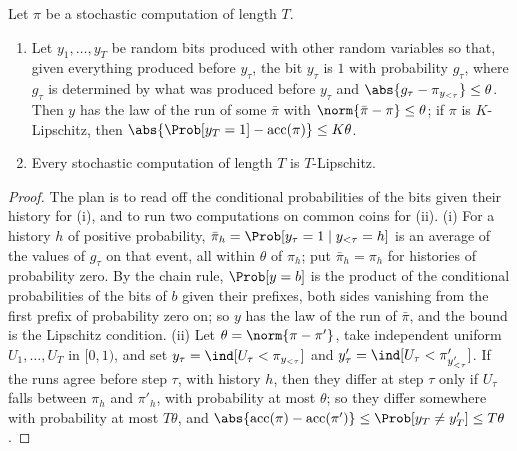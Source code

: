 \begin{refsection}
\begin{lemma}\label{lem:efficientdebate:perturb}
Let $\pi$ be a stochastic computation of length $T$.
\begin{enumerate}
\item Let $y_1,\dots,y_T$ be random bits produced with other random variables so that, given everything produced before $y_\tau$, the bit $y_\tau$ is $1$ with probability $g_\tau$, where $g_\tau$ is determined by what was produced before $y_\tau$ and $\abs{g_\tau-\pi_{y_{<\tau}}}\le\theta$. Then $y$ has the law of the run of some $\bar\pi$ with $\norm{\bar\pi-\pi}\le\theta$; if $\pi$ is $K$-Lipschitz, then $\abs{\Prob[y_T=1]-\efficientdebateacc(\pi)}\le K\theta$.
\item Every stochastic computation of length $T$ is $T$-Lipschitz.
\end{enumerate}
\end{lemma}

\begin{proof}
The plan is to read off the conditional probabilities of the bits given their history for (i), and to run two computations on common coins for (ii). (i) For a history $h$ of positive probability, $\bar\pi_h=\Prob[y_\tau=1\mid y_{<\tau}=h]$ is an average of the values of $g_\tau$ on that event, all within $\theta$ of $\pi_h$; put $\bar\pi_h=\pi_h$ for histories of probability zero. By the chain rule, $\Prob[y=b]$ is the product of the conditional probabilities of the bits of $b$ given their prefixes, both sides vanishing from the first prefix of probability zero on; so $y$ has the law of the run of $\bar\pi$, and the bound is the Lipschitz condition. (ii) Let $\theta=\norm{\pi-\pi'}$, take independent uniform $U_1,\dots,U_T$ in $[0,1)$, and set $y_\tau=\ind[U_\tau<\pi_{y_{<\tau}}]$ and $y'_\tau=\ind[U_\tau<\pi'_{y'_{<\tau}}]$. If the runs agree before step $\tau$, with history $h$, then they differ at step $\tau$ only if $U_\tau$ falls between $\pi_h$ and $\pi'_h$, with probability at most $\theta$; so they differ somewhere with probability at most $T\theta$, and $\abs{\efficientdebateacc(\pi)-\efficientdebateacc(\pi')}\le\Prob[y_T\ne y'_T]\le T\theta$.
\end{proof}


\end{refsection}
